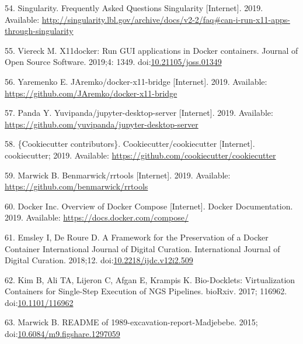 \documentclass[10pt,letterpaper]{article}
\begin{document}
\leavevmode\hypertarget{ref-singularity_frequently_2019}{}%
54. Singularity. Frequently Asked Questions Singularity {[}Internet{]}.
2019. Available:
\url{http://singularity.lbl.gov/archive/docs/v2-2/faq\#can-i-run-x11-apps-through-singularity}

\leavevmode\hypertarget{ref-viereck_x11docker_2019}{}%
55. Viereck M. X11docker: Run GUI applications in Docker containers.
Journal of Open Source Software. 2019;4: 1349.
doi:\href{https://doi.org/10.21105/joss.01349}{10.21105/joss.01349}

\leavevmode\hypertarget{ref-yaremenko_docker-x11-bridge_2019}{}%
56. Yaremenko E. JAremko/docker-x11-bridge {[}Internet{]}. 2019.
Available: \url{https://github.com/JAremko/docker-x11-bridge}

\leavevmode\hypertarget{ref-yuvipanda_jupyter-desktop-server_2019}{}%
57. Panda Y. Yuvipanda/jupyter-desktop-server {[}Internet{]}. 2019.
Available: \url{https://github.com/yuvipanda/jupyter-desktop-server}

\leavevmode\hypertarget{ref-cookiecutter_contributors_cookiecutter_2019}{}%
58. \{Cookiecutter contributors\}. Cookiecutter/cookiecutter
{[}Internet{]}. cookiecutter; 2019. Available:
\url{https://github.com/cookiecutter/cookiecutter}

\leavevmode\hypertarget{ref-marwick_rrtools_2019}{}%
59. Marwick B. Benmarwick/rrtools {[}Internet{]}. 2019. Available:
\url{https://github.com/benmarwick/rrtools}

\leavevmode\hypertarget{ref-docker-compose_2019}{}%
60. Docker Inc. Overview of Docker Compose {[}Internet{]}. Docker
Documentation. 2019. Available: \url{https://docs.docker.com/compose/}

\leavevmode\hypertarget{ref-emsley_framework_2018}{}%
61. Emsley I, De Roure D. A Framework for the Preservation of a Docker
Container International Journal of Digital Curation. International
Journal of Digital Curation. 2018;12.
doi:\href{https://doi.org/10.2218/ijdc.v12i2.509}{10.2218/ijdc.v12i2.509}

\leavevmode\hypertarget{ref-kim_bio-docklets_2017}{}%
62. Kim B, Ali TA, Lijeron C, Afgan E, Krampis K. Bio-Docklets:
Virtualization Containers for Single-Step Execution of NGS Pipelines.
bioRxiv. 2017; 116962.
doi:\href{https://doi.org/10.1101/116962}{10.1101/116962}

\leavevmode\hypertarget{ref-marwick_readme_2015}{}%
63. Marwick B. README of 1989-excavation-report-Madjebebe. 2015;
doi:\href{https://doi.org/10.6084/m9.figshare.1297059}{10.6084/m9.figshare.1297059}
\end{document}
